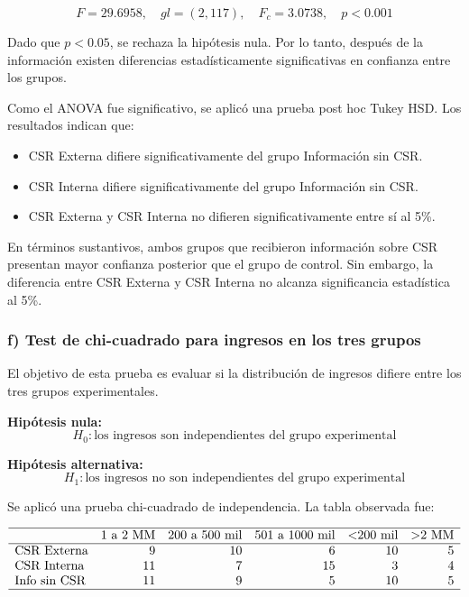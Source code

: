 \documentclass[12pt,letterpaper]{article}
\begin{document}
\[
F = 29.6958,\quad gl = (2,117),\quad F_c = 3.0738,\quad p < 0.001
\]

Dado que \(p < 0.05\), se rechaza la hipótesis nula. Por lo tanto, después de la información existen diferencias estadísticamente significativas en confianza entre los grupos.

Como el ANOVA fue significativo, se aplicó una prueba post hoc Tukey HSD. Los resultados indican que:

\begin{itemize}
    \item CSR Externa difiere significativamente del grupo Información sin CSR.
    \item CSR Interna difiere significativamente del grupo Información sin CSR.
    \item CSR Externa y CSR Interna no difieren significativamente entre sí al 5\%.
\end{itemize}

En términos sustantivos, ambos grupos que recibieron información sobre CSR presentan mayor confianza posterior que el grupo de control. Sin embargo, la diferencia entre CSR Externa y CSR Interna no alcanza significancia estadística al 5\%.

\subsubsection*{f) Test de chi-cuadrado para ingresos en los tres grupos}

El objetivo de esta prueba es evaluar si la distribución de ingresos difiere entre los tres grupos experimentales.

\textbf{Hipótesis nula:}
\[
H_0: \text{los ingresos son independientes del grupo experimental}
\]

\textbf{Hipótesis alternativa:}
\[
H_1: \text{los ingresos no son independientes del grupo experimental}
\]

Se aplicó una prueba chi-cuadrado de independencia. La tabla observada fue:

\[
\begin{array}{lrrrrr}
\hline
 & \text{1 a 2 MM} & \text{200 a 500 mil} & \text{501 a 1000 mil} & \text{<200 mil} & \text{>2 MM} \\
\hline
\text{CSR Externa} & 9 & 10 & 6 & 10 & 5 \\
\text{CSR Interna} & 11 & 7 & 15 & 3 & 4 \\
\text{Info sin CSR} & 11 & 9 & 5 & 10 & 5 \\
\hline
\end{array}
\]
\end{document}
